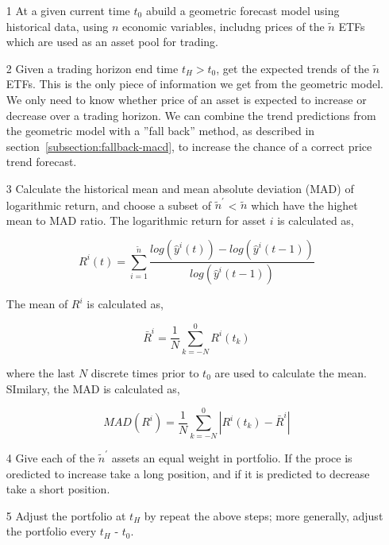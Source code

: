 \documentclass{article}
\begin{document}
\begin{itemize}

  \item[1] At a given current time $t_{0}$ abuild a geometric forecast
    model using historical data, using $n$ economic variables,
    includng prices of the $\tilde{n}$ ETFs which are used as an asset
    pool for trading.

  \item[2] Given a trading horizon end time $t_{H} > t_{0}$, get the
    expected trends of the $\tilde{n}$ ETFs. This is the only piece of
    information we get from the geometric model. We only need to know
    whether price of an asset is expected to increase or decrease over
    a trading horizon. We can combine the trend predictions from the
    geometric model with a ''fall back'' method, as described in
    section~\ref{subsection:fallback-macd}, to increase the chance of
    a correct price trend forecast.

    \item[3] Calculate the historical mean and mean absolute deviation
      (MAD) of logarithmic return, and choose a subset of
      $\tilde{n}^{\prime}$ < $\tilde{n}$ which have the highet mean to
      MAD ratio. The logarithmic return for asset $i$ is calculated
      as,

      \begin{equation}\label{eqn:log-return}
        R^{i}(t) = \sum_{i=1}^{\tilde{n}}
        \frac{log(\hat{y}^{i}(t))-log(\hat{y}^{i}(t-1))}{log(\hat{y}^{i}(t-1))}
      \end{equation}

      The mean of $R^{i}$ is calculated as,

      \begin{equation}\label{eqn:log-return-mean}
        \bar{R}^{i} = \frac{1}{N} \sum_{k=-N}^{0} R^{i}(t_{k})
      \end{equation}

      where the last $N$ discrete times prior to $t_{0}$ are used to
      calculate the mean. SImilary, the MAD is calculated as,
      
      \begin{equation}\label{eqn:log-return-mad}
        MAD(R^{i}) = \frac{1}{N} \sum_{k=-N}^{0} |R^{i}(t_{k}) - \bar{R}^{i}|
      \end{equation}
      
  \item[4] Give each of the $\tilde{n}^{\prime}$ assets an equal
    weight in portfolio. If the proce is oredicted to increase take a
    long position, and if it is predicted to decrease take a short
    position.

   \item[5] Adjust the portfolio at $t_{H}$ by repeat the above steps;
     more generally, adjust the portfolio every $t_{H}$ - $t_{0}$.
      
\end{itemize}
\end{document}
